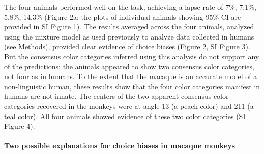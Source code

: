The four animals performed well on the task, achieving a lapse rate of 7\%, 7.1\%, 5.8\%, 14.3\% (Figure 2a; the plots of individual animals showing 95\% CI are provided in SI Figure 1). The results averaged across the four animals, analyzed using the mixture model as used previously to analyze data collected in humans \citep{bae_why_2015,zhang_discrete_2008} (see Methods), provided clear evidence of choice biases (Figure 2, SI Figure 3). But the consensus color categories inferred using this analysis do not support any of the predictions: the animals appeared to show two consensus color categories, not four as in humans. To the extent that the macaque is an accurate model of a non-linguistic human, these results show that the four color categories manifest in humans are not innate. The centers of the two apparent consensus color categories recovered in the monkeys were at angle 13 (a peach color) and 211 (a teal color). All four animals showed evidence of these two color categories (SI Figure 4).

\paragraph{Two possible explanations for choice biases in macaque monkeys}

